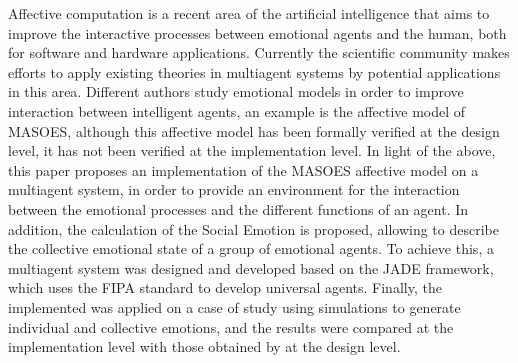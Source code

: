 %
%
%

Affective computation is a recent area of the artificial intelligence
that aims to improve the interactive processes between emotional agents and the human,
both for software and hardware applications.
Currently the scientific community makes efforts to apply existing theories in
multiagent systems by potential applications in this area.
Different authors study emotional models in order to improve interaction between intelligent agents,
an example is the affective model of MASOES,
although this affective model has been formally verified at the design level,
it has not been verified at the implementation level.
In light of the above, this paper proposes an implementation of the MASOES affective model on a multiagent system,
in order to provide an environment for the interaction between the emotional processes and the different functions of an agent.
In addition, the calculation of the Social Emotion is proposed,
allowing to describe the collective emotional state of a group of emotional agents.
To achieve this, a multiagent system was designed and developed based on the JADE framework,
which uses the FIPA standard to develop universal agents.
Finally, the implemented was applied on a case of study using simulations
to generate individual and collective emotions,
and the results were compared at the implementation level with those obtained by \cite{perozo2011} at the design level.
